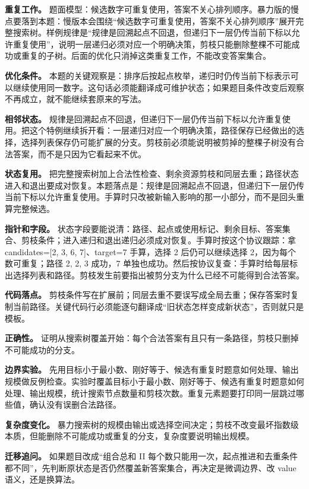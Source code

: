 \textbf{重复工作。} 题面模型：候选数字可重复使用，答案不关心排列顺序。暴力版的慢点要落到本题：慢版本会围绕“候选数字可重复使用，答案不关心排列顺序”展开完整搜索树。样例规律是“规律是回溯起点不回退，但递归下一层仍传当前下标以允许重复使用”，说明一层递归必须对应一个明确决策，剪枝只能删除整棵不可能成功或重复的子树。后面的优化只消掉这类重复工作，不能改变答案集合。

\textbf{优化条件。} 本题的关键观察是：排序后按起点枚举，递归时仍传当前下标表示可以继续使用同一数字。这句话必须能翻译成可维护状态；如果题目条件改变后观察不再成立，就不能继续套原来的写法。

\textbf{相邻状态。} 规律是回溯起点不回退，但递归下一层仍传当前下标以允许重复使用。把这个特例继续拆开看：一层递归对应一个明确决策，路径保存已经做出的选择，选择列表保存仍可能扩展的分支。剪枝前必须能说明被剪掉的整棵子树没有合法答案，而不是只因为它看起来不优。

\textbf{状态复用。} 把完整搜索树加上合法性检查、剩余资源剪枝和同层去重；路径状态进入和退出要成对恢复。本题落点是：规律是回溯起点不回退，但递归下一层仍传当前下标以允许重复使用。手算时只改被新输入影响的那一小部分，而不是回头重算完整候选。

\textbf{指针和字段。} 状态字段要能说清：路径、起点或使用标记、剩余目标、答案集合、剪枝条件；进入递归和退出递归必须成对恢复。手算时按这个协议跟踪：拿 candidates=[2, 3, 6, 7]、target=7 手算，选择 2 后仍可以继续选择 2，因为每个数可重复；路径 2, 2, 3 成功，7 单独也成功。然后按协议复查：手算时给每层标出选择列表和路径。剪枝发生前要指出被剪分支为什么已经不可能得到合法答案。

\textbf{代码落点。} 剪枝条件写在扩展前；同层去重不要误写成全局去重；保存答案时复制当前路径。关键代码行必须能逐句翻译成“旧状态怎样变成新状态”，否则就只是模板。

\textbf{正确性。} 证明从搜索树覆盖开始：每个合法答案有且只有一条路径，剪枝只删掉不可能成功的分支。

\textbf{边界实验。} 先用目标小于最小数、刚好等于、候选有重复时题意如何处理、输出规模做反例检查。实验时覆盖目标小于最小数、刚好等于、候选有重复时题意如何处理、输出规模，统计搜索节点数量和剪枝次数。重复元素题要打印同一层跳过哪些值，确认没有误删合法路径。

\textbf{复杂度变化。} 暴力搜索树的规模由输出或选择空间决定；剪枝不改变最坏指数级本质，但能删除不可能成功或重复的分支，复杂度要说明输出规模。

\textbf{迁移追问。} 如果题目改成“组合总和 II 每个数只能用一次，起点推进和去重条件都不同”，先判断原状态是否仍然覆盖新答案集合，再决定是微调边界、改 value 语义，还是换算法。

